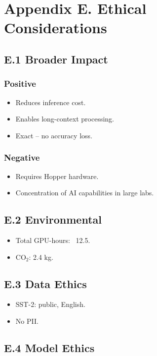 \section{Appendix E. Ethical Considerations}

\subsection{E.1 Broader Impact}

\subsubsection{Positive}
\begin{itemize}
\item Reduces inference cost.
\item Enables long-context processing.
\item Exact -- no accuracy loss.

\end{itemize}
\subsubsection{Negative}
\begin{itemize}
\item Requires Hopper hardware.
\item Concentration of AI capabilities in large labs.

\end{itemize}
\subsection{E.2 Environmental}

\begin{itemize}
\item Total GPU-hours: ~12.5.
\item CO$_2$: 2.4 kg.

\end{itemize}
\subsection{E.3 Data Ethics}

\begin{itemize}
\item SST-2: public, English.
\item No PII.

\end{itemize}
\subsection{E.4 Model Ethics}

